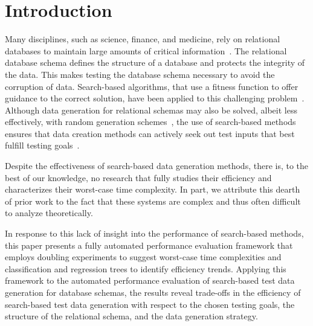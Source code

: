 
\vspace*{-.25in}
\section{Introduction}
\vspace*{-.05in}



Many disciplines, such as science, finance, and medicine, rely on relational databases to maintain large amounts of
critical information~\cite{kapfhammer2007}. The relational database schema defines the structure of a database and
protects the integrity of the data. This makes testing the database schema necessary to avoid the corruption of data.
Search-based algorithms, that use a fitness function to offer guidance to the correct solution, have been applied to
this challenging problem~\cite{Kapfhammer2013}. Although data generation for relational schemas may also be solved,
albeit less effectively, with random generation schemes~\cite{McMinn2015}, the use of search-based methods ensures that
data creation methods can actively seek out test inputs that best fulfill testing goals~\cite{McMinn2004a}.


Despite the effectiveness of search-based data generation methods, there is, to the best of our knowledge, no research
that fully studies their efficiency and characterizes their worst-case time complexity. In part, we attribute this
dearth of prior work to the fact that these systems are complex and thus often difficult to analyze theoretically.

In response to this lack of insight into the performance of search-based methods, this paper presents a fully automated
performance evaluation framework that employs doubling experiments to suggest worst-case time complexities and
classification and regression trees to identify efficiency trends. Applying this framework to the automated performance
evaluation of search-based test data generation for database schemas, the results reveal trade-offs in the efficiency of
search-based test data generation with respect to the chosen testing goals, the structure of the relational
schema, and the data generation strategy.

